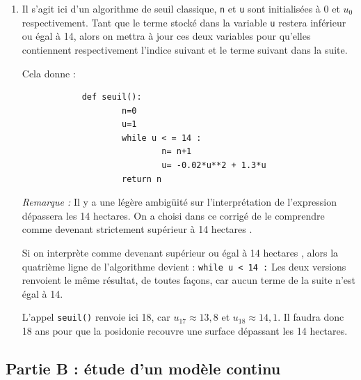 \begin{enumerate}
\begin{enumerate}
		Il existe donc une année à partir de laquelle la posidonie recouvrira une surface dépassant les .

		\item Il s'agit ici d'un algorithme de seuil classique, \texttt{n} et \texttt{u} sont initialisées à 0 et $u_0$ respectivement. Tant que le terme stocké dans la variable \texttt{u} restera inférieur ou égal à 14, alors on mettra à jour ces deux variables pour qu'elles contiennent respectivement l'indice suivant et le terme suivant dans la suite.

		Cela donne :

		\begin{verbatim}
			def seuil():
					n=0
					u=1
					while u < = 14 :
							n= n+1
							u= -0.02*u**2 + 1.3*u
					return n
		\end{verbatim}

	\emph{Remarque :} Il y a une légère ambigüité sur l'interprétation de l'expression \og dépassera les 14 hectares\fg{}. On a choisi dans ce corrigé de le comprendre comme \og devenant strictement supérieur à 14 hectares \fg{}.

	Si on interprète comme \og devenant supérieur ou égal à 14 hectares \fg{}, alors la quatrième ligne de l'algorithme devient : \quad \texttt{while u < 14 :}
	Les deux versions renvoient le même résultat, de toutes façons, car aucun terme de la suite n'est égal à 14.

	L'appel \texttt{seuil()} renvoie ici 18, car $u_{17} \approx 13,8$ et $u_{18} \approx 14,1$. Il faudra donc 18 ans pour que la posidonie recouvre une surface dépassant les 14 hectares.
	\end{enumerate}
\end{enumerate}

\subsection*{Partie B : étude d'un modèle continu}

